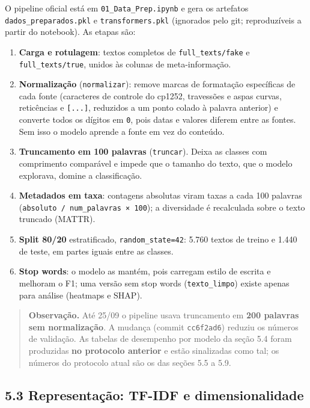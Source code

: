 \documentclass[
  brazilian,
  11pt,
]{article}
\providecommand{\tightlist}{%
  \setlength{\itemsep}{0pt}\setlength{\parskip}{0pt}}
\begin{document}
O pipeline oficial está em \texttt{01\_Data\_Prep.ipynb} e gera os artefatos \texttt{dados\_preparados.pkl} e \texttt{transformers.pkl} (ignorados pelo git; reproduzíveis a partir do notebook). As etapas são:

\begin{enumerate}
\def\labelenumi{\arabic{enumi}.}
\tightlist
\item
  \textbf{Carga e rotulagem}: textos completos de \texttt{full\_texts/fake} e \texttt{full\_texts/true}, unidos às colunas de meta-informação.
\item
  \textbf{Normalização} (\texttt{normalizar}): remove marcas de formatação específicas de cada fonte (caracteres de controle do cp1252, travessões e aspas curvas, reticências e \texttt{{[}...{]}}, reduzidos a um ponto colado à palavra anterior) e converte todos os dígitos em \texttt{0}, pois datas e valores diferem entre as fontes. Sem isso o modelo aprende a fonte em vez do conteúdo.
\item
  \textbf{Truncamento em 100 palavras} (\texttt{truncar}). Deixa as classes com comprimento comparável e impede que o tamanho do texto, que o modelo explorava, domine a classificação.
\item
  \textbf{Metadados em taxa}: contagens absolutas viram taxas a cada 100 palavras (\texttt{absoluto\ /\ num\_palavras\ ×\ 100}); a diversidade é recalculada sobre o texto truncado (MATTR).
\item
  \textbf{Split 80/20} estratificado, \texttt{random\_state=42}: 5.760 textos de treino e 1.440 de teste, em partes iguais entre as classes.
\item
  \textbf{Stop words}: o modelo as mantém, pois carregam estilo de escrita e melhoram o F1; uma versão sem stop words (\texttt{texto\_limpo}) existe apenas para análise (heatmaps e SHAP).
\end{enumerate}

\begin{quote}
\textbf{Observação.} Até 25/09 o pipeline usava truncamento em \textbf{200 palavras sem normalização}. A mudança (commit \texttt{cc6f2ad6}) reduziu os números de validação. As tabelas de desempenho por modelo da seção 5.4 foram produzidas \textbf{no protocolo anterior} e estão sinalizadas como tal; os números do protocolo atual são os das seções 5.5 a 5.9.
\end{quote}

\subsection{5.3 Representação: TF-IDF e dimensionalidade}\label{representauxe7uxe3o-tf-idf-e-dimensionalidade}
\end{document}
